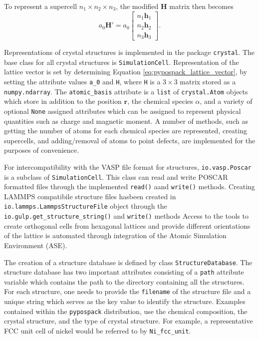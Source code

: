 To represent a supercell $n_1 \times n_2 \times n_3$, the modified $\bm{H}$ matrix then becomes
\begin{equation}
\label{eq:pypospack_supercell_representation}
	a_0 \bm{H}'
	=
	a_0 \begin{bmatrix}
	        n_1 \bm{h}_1 \\
					n_2 \bm{h}_2 \\
					n_3 \bm{h}_3
			\end{bmatrix}.
\end{equation}

Representations of crystal structures is implemented in the package \verb|crystal|.  The base class for all crystal structures is \verb|SimulationCell|.  Representation of the lattice vector is set by determining Equation \ref{eq:pypospack_lattice_vector}, by setting the attribute values \verb|a_0| and \verb|H|, where \verb|H| is a $3 \times 3$ matrix stored as a \verb|numpy.ndarray|.  The \verb|atomic_basis| attribute is a \verb|list| of \verb|crystal.Atom| objects which store in addition to the position $\bm{r}$, the chemical species $\alpha$, and a variety of optional \verb|None| assigned attributes which can be assigned to represent physical quantities such as charge and magnetic moment.
A number of methods, such as getting the number of atoms for each chemical species are represented, creating supercells, and adding/removal of atoms to point defects, are implemented for the purposes of convenience.

For intercompatibility with the VASP file format for structures, \verb|io.vasp.Poscar| is a subclass of \verb|SimulationCell|.  This class can read and write POSCAR formatted files through the implemented \verb|read()| aand \verb|write()| methods.
Creating LAMMPS compatibile structure files hasbeen created in \verb|io.lammps.LammpsStructureFile| object through the \verb|io.gulp.get_structure_string()| and \verb|write()| methods
Access to the tools to create orthogonal cells from hexagonal lattices and provide different orientations of the lattice is automated through integration of the Atomic Simulation Environment (ASE)\cite{larsen2017_ase}.

The creation of a structure database is defined by class \verb|StructureDatabase|.  The structure database has two important attributes consisting of a \verb|path| attribute variable which contains the path to the directory containing all the structures.  For each structure, one needs to provide the \verb|filename| of the structure file and a unique string which serves as the key value to identify the structure.  Examples contained within the \verb|pypospack| distribution, use the chemical composition, the crystal structure, and the type of crystal structure.  For example, a representative FCC unit cell of nickel would be referred to by \verb|Ni_fcc_unit|.

